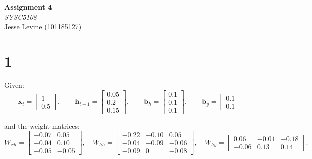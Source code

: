 \documentclass[11pt]{article}
\begin{document}
\begin{titlepage}
    \begin{center}
        \vspace*{2cm}
        \Huge\textbf{Assignment 4} \\
        \vspace{0.25cm}
        \Large\textit{SYSC5108} \\
        \vspace{2cm}
        \Large Jesse Levine (101185127) \\
        \vfill
    \end{center}
\end{titlepage}

\newpage
{}

\section*{1}

Given:
\[
\bm{x}_t=
\begin{bmatrix}
1\\
0.5
\end{bmatrix},
\qquad
\bm{h}_{t-1}=
\begin{bmatrix}
0.05\\
0.2\\
0.15
\end{bmatrix},
\qquad
\bm{b}_h=
\begin{bmatrix}
0.1\\
0.1\\
0.1
\end{bmatrix},
\qquad
\bm{b}_y=
\begin{bmatrix}
0.1\\
0.1
\end{bmatrix}
\]

and the weight matrices:
\[
W_{xh}=
\begin{bmatrix}
-0.07 & 0.05\\
-0.04 & 0.10\\
-0.05 & -0.05
\end{bmatrix},
\quad
W_{hh}=
\begin{bmatrix}
-0.22 & -0.10 & 0.05\\
-0.04 & -0.09 & -0.06\\
-0.09 & 0 & -0.08
\end{bmatrix},
\quad
W_{hy}=
\begin{bmatrix}
0.06 & -0.01 & -0.18\\
-0.06 & 0.13 & 0.14
\end{bmatrix}.
\]
\end{document}
